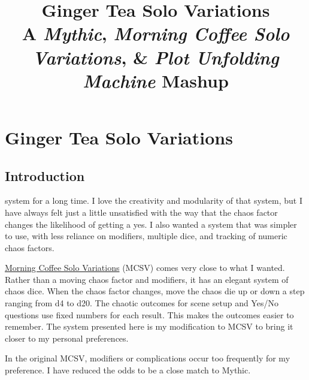 

\title{
\Huge{Ginger Tea Solo Variations}
\\ \small{A \emph{Mythic}, \emph{Morning Coffee Solo Variations}, \& \emph{Plot Unfolding Machine} Mashup}
}


\onecolumn
\frontmatter{}

\mainmatter{}

\chapter*{Ginger Tea Solo Variations \version}

\section{Introduction}
system for a long time. I love the creativity and modularity of that system,
but I have always felt just a little unsatisfied with the way that the chaos
factor changes the likelihood of getting a yes. I also wanted a system
that was simpler to use, with less reliance on modifiers, multiple dice, and
tracking of numeric chaos factors.

\href{https://aleaiactandaest.blogspot.com/p/downloads.html}{Morning Coffee Solo
Variations} (MCSV) comes very close to what I wanted. Rather than a moving chaos
factor and modifiers, it has an elegant system of chaos dice. When the chaos
factor changes, move the chaos die up or down a step ranging from d4 to d20. The
chaotic outcomes for scene setup and Yes/No questions use fixed numbers for each
result. This makes the outcomes easier to remember. The system presented here is
my modification to MCSV to bring it closer to my personal preferences.

In the original MCSV, modifiers or complications occur too frequently for my
preference. I have reduced the odds to be a close match to Mythic.

